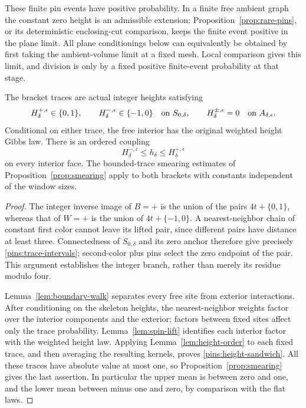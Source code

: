These finite pin events have positive probability.  In a finite free
ambient graph the constant zero height is an admissible extension;
Proposition~\ref{prop:rare-pins}, or its deterministic enclosing-cut
comparison, keeps the finite event positive in the plane limit.  All
plane conditionings below can equivalently be obtained by first taking
the ambient-volume limit at a fixed mesh.  Local comparison gives this
limit, and division is only by a fixed positive finite-event probability
at that stage.

\begin{lemma}\label{pins:bracket-order}
The bracket traces are actual integer heights satisfying
\begin{equation}\label{pins:trace-intervals}
 H_\delta^{+,\epsilon}\in\{0,1\},\qquad
 H_\delta^{-,\epsilon}\in\{-1,0\}
 \quad\hbox{on }S_{0,\delta},\qquad
 H_\delta^{\pm,\epsilon}=0\quad\hbox{on }A_{\delta,\epsilon}.
\end{equation}
Conditional on either trace, the free interior has the original weighted
height Gibbs law.  There is an ordered coupling
\begin{equation}\label{pins:height-sandwich}
 H_\delta^{-,\epsilon}\le h_\delta\le H_\delta^{+,\epsilon}
\end{equation}
on every interior face.  The bounded-trace smearing estimates of
Proposition~\ref{prop:smearing} apply to both brackets with constants
independent of the window sizes.
\end{lemma}

\begin{proof}
The integer inverse image of $B=+$ is the union of the pairs
$4t+\{0,1\}$, whereas that of $W=+$ is the union of
$4t+\{-1,0\}$.  A nearest-neighbor chain of constant first color cannot
leave its lifted pair, since different pairs have distance at least
three.  Connectedness of $S_{0,\delta}$ and its zero anchor therefore
give precisely \eqref{pins:trace-intervals}; second-color plus pins
select the zero endpoint of the pair.  This argument establishes the
integer branch, rather than merely its residue modulo four.

Lemma~\ref{lem:boundary-walk} separates every free site from exterior
interactions.  After conditioning on the skeleton heights, the
nearest-neighbor weights factor over the interior components and the
exterior; factors between fixed sites affect only the trace probability.
Lemma~\ref{lem:spin-lift} identifies each interior factor with the
weighted height law.  Applying Lemma~\ref{lem:height-order} to each
fixed trace, and then averaging the resulting kernels, proves
\eqref{pins:height-sandwich}.  All these traces have absolute value at
most one, so Proposition~\ref{prop:smearing} gives the last assertion.
In particular the upper mean is between zero and one, and the lower
mean between minus one and zero, by comparison with the flat laws.
\end{proof}

